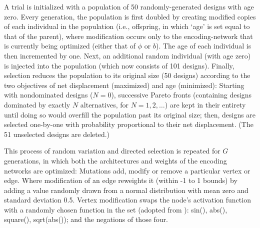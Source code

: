  
A trial is initialized with a population of 50 randomly-generated designs with age zero.
Every generation, the population is first doubled by creating modified copies of each individual in the population (i.e., offspring, in which `age' is set equal to that of the parent), where modification occurs only to the encoding-network that is currently being optimized (either that of $\phi$ or $b$).
The age of each individual is then incremented by one. 
Next, an additional random individual (with age zero) is injected into the population (which now consists of 101 designs). 
Finally, selection reduces the population to its original size (50 designs) according to the two objectives of net displacement (maximized) and age (minimized): Starting with nondominated designs ($N=0$), successive Pareto fronts (containing designs dominated by exactly $N$ alternatives, for $N=1,2,\ldots$) are kept in their entirety until doing so would overfill the population past its original size; then, designs are selected one-by-one with probability proportional to their net displacement. (The 51 unselected designs are deleted.)


This process of random variation and directed selection is repeated for 
$G$ generations, in which
both the architectures and weights of the encoding networks are optimized:
Mutations add, modify or remove a particular vertex or edge.
Where modification of an edge reweights it (within -1 to 1 bounds) by adding a value randomly drawn from a normal distribution with mean zero and standard deviation 0.5.
Vertex modification swaps the node's activation function with a randomly chosen function in the set (adopted from \cite{kriegman2018interoceptive}): sin(), abs(), square(), sqrt(abs()); and the negations of those four. 

